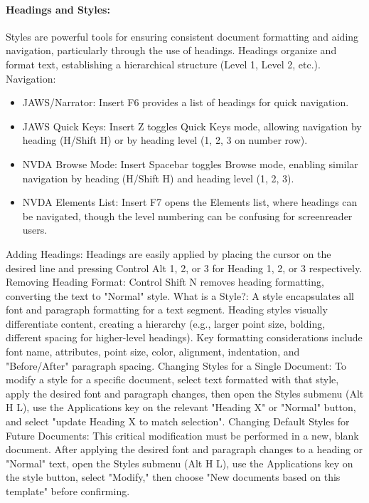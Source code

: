 \paragraph{Headings and Styles:}
Styles are powerful tools for ensuring consistent document formatting and aiding navigation, particularly through the use of headings. Headings organize and format text, establishing a hierarchical structure (Level 1, Level 2, etc.).\supercite{kingsbury2025}
Navigation:
\begin{itemize}
	\item JAWS/Narrator: Insert F6 provides a list of headings for quick navigation.\supercite{kingsbury2025}
	\item JAWS Quick Keys: Insert Z toggles Quick Keys mode, allowing navigation by heading (H/Shift H) or by heading level (1, 2, 3 on number row).\supercite{kingsbury2025}
	\item NVDA Browse Mode: Insert Spacebar toggles Browse mode, enabling similar navigation by heading (H/Shift H) and heading level (1, 2, 3).\supercite{kingsbury2025}
	\item NVDA Elements List: Insert F7 opens the Elements list, where headings can be navigated, though the level numbering can be confusing for screenreader users.\supercite{kingsbury2025}
\end{itemize}
Adding Headings: Headings are easily applied by placing the cursor on the desired line and pressing Control Alt 1, 2, or 3 for Heading 1, 2, or 3 respectively.\supercite{kingsbury2025}
Removing Heading Format: Control Shift N removes heading formatting, converting the text to "Normal" style.\supercite{kingsbury2025}
What is a Style?: A style encapsulates all font and paragraph formatting for a text segment. Heading styles visually differentiate content, creating a hierarchy (e.g., larger point size, bolding, different spacing for higher-level headings).\supercite{kingsbury2025} Key formatting considerations include font name, attributes, point size, color, alignment, indentation, and "Before/After" paragraph spacing.\supercite{kingsbury2025}
Changing Styles for a Single Document: To modify a style for a specific document, select text formatted with that style, apply the desired font and paragraph changes, then open the Styles submenu (Alt H L), use the Applications key on the relevant "Heading X" or "Normal" button, and select "update Heading X to match selection".\supercite{kingsbury2025}
Changing Default Styles for Future Documents: This critical modification must be performed in a new, blank document. After applying the desired font and paragraph changes to a heading or "Normal" text, open the Styles submenu (Alt H L), use the Applications key on the style button, select "Modify," then choose "New documents based on this template" before confirming.\supercite{kingsbury2025}

